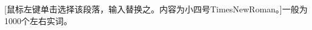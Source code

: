 \begin{englishabstract}

	[鼠标左键单击选择该段落，输入替换之。内容为小四号TimesNewRoman。]一般为1000个左右实词。

	\vspace{50pt}

	\noindent{}

\end{englishabstract}